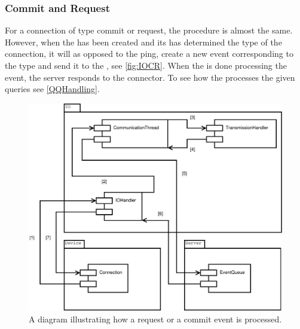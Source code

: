 \subsubsection*{Commit and Request}
For a connection of type commit or request, the procedure is almost the same. However, when the  has been created and its  has determined the type of the connection, it will as opposed to the ping, create a new event corresponding to the type and send it to the , see \autoref{fig:IOCR}.
When the  is done processing the event, the server responds to the connector.
To see how the  processes the given queries see \autoref{QQHandling}.

\begin{figure}[htbp]
	\centering
		\includegraphics[scale=0.40]{images/requestCommit}
	\caption{A diagram illustrating how a request or a commit event is processed.}
	\label{fig:IOCR}
\end{figure}